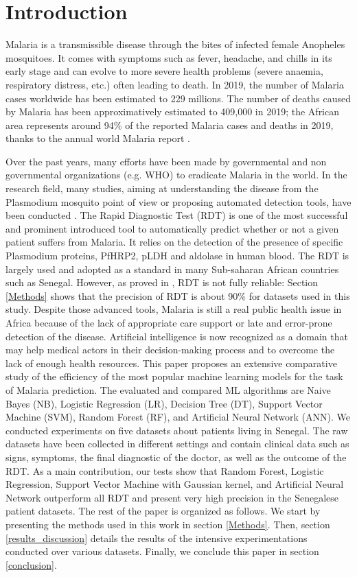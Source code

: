 \section{Introduction}\label{Introduction}
Malaria is a transmissible disease through the bites of infected female Anopheles mosquitoes. It comes with symptoms such as fever, headache, and chills in its early stage and can evolve to more severe health problems (severe anaemia, respiratory distress, etc.) often leading to death. In 2019, the number of Malaria cases worldwide has been estimated to 229 millions. The number of deaths caused by Malaria has been approximatively estimated to 409,000 in 2019; the African area represents around 94\% of the reported Malaria cases and deaths in 2019, thanks to the annual world Malaria report \cite{19WMR}. 

Over the past years, many efforts have been made by governmental and non governmental organizations (e.g. WHO) to eradicate Malaria in the world.  In the research field, many studies, aiming at understanding the disease from the Plasmodium mosquito point of view or proposing automated detection tools, have been conducted \cite{Ga19,Le74,ermert2011development,Hu17}. The Rapid Diagnostic Test (RDT) \cite{Hu17} is one of the most successful and prominent introduced tool to automatically predict whether or not a given patient suffers from Malaria. It relies on the detection of the presence of specific Plasmodium proteins, PfHRP2, pLDH
and aldolase in human blood. The RDT is largely used and adopted as a standard in many Sub-saharan African countries such as Senegal. However, as proved in \cite{Hu17}, RDT is not fully reliable:  Section \ref{Methods} shows that the precision of RDT is about 90\% for datasets used in this study. Despite those advanced tools, Malaria is still a real public health issue in Africa because of the lack of appropriate care support or late and error-prone detection of the disease.
Artificial intelligence is now recognized as a domain that may help medical actors in their decision-making process \cite{mitchell1997machine, Ug1}  and to overcome the lack of enough health resources.
 This paper proposes an  extensive comparative study of the efficiency of the most popular machine learning models for the task of Malaria prediction. The evaluated and compared ML algorithms are Naive Bayes (NB), Logistic Regression (LR),  Decision Tree (DT), Support Vector Machine (SVM), Random Forest (RF), and Artificial Neural Network (ANN). We conducted experiments on five datasets about patients living in Senegal. The raw
 datasets have been collected in different settings and contain clinical data such as signs, symptoms, the final diagnostic of the doctor, as well as the outcome of the RDT. As a main contribution,  our tests show that Random Forest, Logistic Regression, Support Vector Machine with Gaussian kernel, and Artificial Neural Network outperform all RDT and present very high precision in the Senegalese patient datasets. The rest of the paper is organized as follows. We start by presenting the methods used in this work in section \ref{Methods}. Then, section \ref{results_discussion} details the results of the intensive experimentations conducted over various datasets. Finally, we conclude this paper in section \ref{conclusion}.
